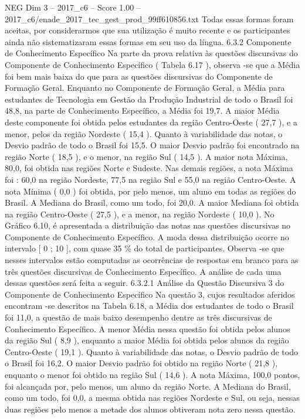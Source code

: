 \begin{textsample}{NEG Dim 3 – 2017\_c6 – Score 1.00 – 2017\_c6/enade\_2017\_tec\_gest\_prod\_99ff610856.txt}
Todas essas formas foram aceitas, por considerarmos que sua utilização é muito recente e os participantes ainda não sistematizaram essas formas em seu uso da língua. 6.3.2 Componente de Conhecimento Específico Na parte da prova relativa às questões discursivas do Componente de Conhecimento Específico ( Tabela 6.17 ), observa -se que a Média foi bem mais baixa do que para as questões discursivas do Componente de Formação Geral.
Enquanto no Componente de Formação Geral, a Média para estudantes de Tecnologia em Gestão da Produção Industrial de todo o Brasil foi 48,8, na parte de Conhecimento Específico, a Média foi 19,7.
A maior Média deste componente foi obtida pelos estudantes da região Centro-Oeste ( 27,7 ), e a menor, pelos da região Nordeste ( 15,4 ).
Quanto à variabilidade das notas, o Desvio padrão de todo o Brasil foi 15,5.
O maior Desvio padrão foi encontrado na região Norte ( 18,5 ), e o menor, na região Sul ( 14,5 ).
A maior nota Máxima, 80,0, foi obtida nas regiões Norte e Sudeste.
Nas demais regiões, a nota Máxima foi : 60,0 na região Nordeste, 77,5 na região Sul e 55,0 na região Centro-Oeste.
A nota Mínima ( 0,0 ) foi obtida, por pelo menos, um aluno em todas as regiões do Brasil.
A Mediana do Brasil, como um todo, foi 20,0.
A maior Mediana foi obtida na região Centro-Oeste ( 27,5 ), e a menor, na região Nordeste ( 10,0 ).
No Gráfico 6.10, é apresentada a distribuição das notas nas questões discursivas no Componente de Conhecimento Específico.
A moda dessa distribuição ocorre no intervalo [ 0 ; 10 ], com quase 35 \% do total de participantes.
Observa -se que nesses intervalos estão computadas as ocorrências de respostas em branco para as três questões discursivas de Conhecimento Específico.
A análise de cada uma dessas questões será feita a seguir. 6.3.2.1 Análise da Questão Discursiva 3 do Componente de Conhecimento Específico Na questão 3, cujos resultados aferidos encontram -se descritos na Tabela 6.18, a Média dos estudantes de todo o Brasil foi 11,0, a questão de mais baixo desempenho dentre as três discursivas de Conhecimento Específico.
A menor Média nessa questão foi obtida pelos alunos da região Sul ( 8,9 ), enquanto a maior Média foi obtida pelos alunos da região Centro-Oeste ( 19,1 ).
Quanto à variabilidade das notas, o Desvio padrão de todo o Brasil foi 16,2.
O maior Desvio padrão foi obtido na região Norte ( 21,8 ), enquanto o menor foi obtido na região Sul ( 14,6 ).
A nota Máxima, 100,0 pontos, foi alcançada por, pelo menos, um aluno da região Norte.
A Mediana do Brasil, como um todo, foi 0,0, a mesma obtida nas regiões Nordeste e Sul, ou seja, nessas duas regiões pelo menos a metade dos alunos obtiveram nota zero nessa questão.

\end{textsample}
